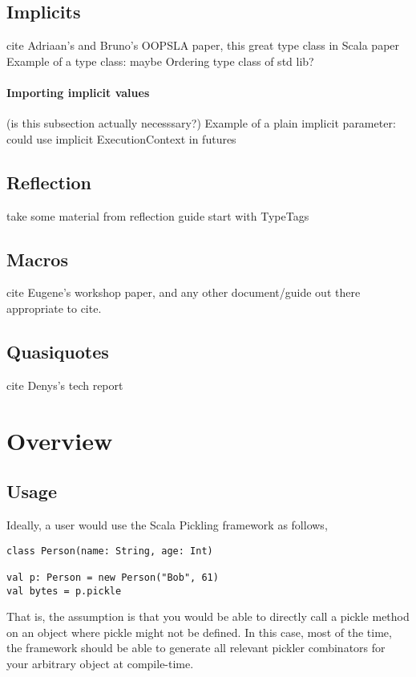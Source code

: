 \documentclass[preprint,10pt]{sigplanconf}
\begin{document}
\subsection{Implicits}
cite Adriaan's and Bruno's OOPSLA paper, this great type class in Scala paper
Example of a type class: maybe Ordering type class of std lib?

\paragraph{Importing implicit values}
(is this subsection actually necesssary?)
Example of a plain implicit parameter: could use implicit ExecutionContext in futures

\subsection{Reflection}
take some material from reflection guide
start with TypeTags

\subsection{Macros}
cite Eugene's workshop paper, and any other document/guide out there appropriate to cite.

\subsection{Quasiquotes}
cite Denys's tech report

\section{Overview}

\subsection{Usage}

Ideally, a user would use the Scala Pickling framework as follows,

\begin{verbatim}
class Person(name: String, age: Int)

val p: Person = new Person("Bob", 61)
val bytes = p.pickle
\end{verbatim}\noindent

That is, the assumption is that you would be able to directly call a
pickle method on an object where pickle might not be defined. In this
case, most of the time, the framework should be able to generate all
relevant pickler combinators for your arbitrary object at
compile-time.
\end{document}

